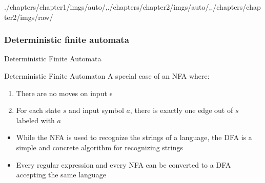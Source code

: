 \begin{graphicspathcontext}{{./chapters/chapter1/imgs/auto/},{./chapters/chapter2/imgs/auto/},{./chapters/chapter2/imgs/raw/}}
\begin{bibunit}[apalike]
\subsubsection{Deterministic finite automata}
\subsubsectiontableofcontentslide

\begin{frame}{Deterministic Finite Automata}
	\begin{definitionblock}{Deterministic Finite Automaton}
		A special case of an NFA where:
		\begin{enumerate}
		\item There are no moves on input $\epsilon$
		\item For each state $s$ and input symbol $a$, there is exactly one edge out of $s$ labeled with $a$
		\end{enumerate}
	\end{definitionblock}
	\vspace{.5cm}
	\begin{itemize}
	\item While the NFA is used to recognize the strings of a language, the DFA is a simple and concrete algorithm for recognizing strings
	\vfill
	\item Every regular expression and every NFA can be converted to a DFA accepting the same language
	\end{itemize}
	\vspace{.5cm}
\end{frame}


\end{bibunit}
\end{graphicspathcontext}
